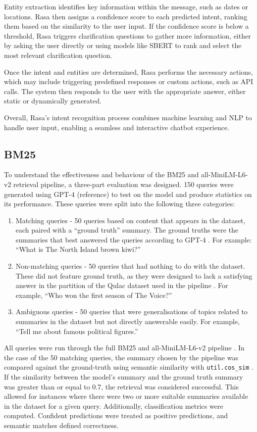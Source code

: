 \documentclass[11pt]{article}
\begin{document}
Entity extraction identifies key information within the message, such as dates or locations. Rasa then assigns a confidence score to each predicted intent, ranking them based on the similarity to the user input. If the confidence score is below a threshold, Rasa triggers clarification questions to gather more information, either by asking the user directly or using models like SBERT to rank and select the most relevant clarification question.

Once the intent and entities are determined, Rasa performs the necessary actions, which may include triggering predefined responses or custom actions, such as API calls. The system then responds to the user with the appropriate answer, either static or dynamically generated.

Overall, Rasa's intent recognition process combines machine learning and NLP to handle user input, enabling a seamless and interactive chatbot experience.

\subsection{BM25}
To understand the effectiveness and behaviour of the BM25 and all-MiniLM-L6-v2 retrieval pipeline, a three-part evaluation was designed. 150 queries were generated using GPT-4 (reference) to test on the model and produce statistics on its performance. These queries were split into the following three categories:
\begin{enumerate}
\item Matching queries - 50 queries based on content that appears in the dataset, each paired with a “ground truth” summary. The ground truths were the summaries that best answered the queries according to GPT-4 \cite{OpenAI2025}. For example: “What is The North Island brown kiwi?”
\item Non-matching queries - 50 queries that had nothing to do with the dataset. These did not feature ground truth, as they were designed to lack a satisfying answer in the partition of the Qulac dataset used in the pipeline \cite{Aliannejadi2021}. For example, “Who won the first season of The Voice?”
\item Ambiguous queries - 50 queries that were generalisations of topics related to summaries in the dataset but not directly answerable easily. For example, “Tell me about famous political figures.”
\end{enumerate}

All queries were run through the full BM25 and all-MiniLM-L6-v2 pipeline \cite{Brown2022,Tomaarsen2025a}. In the case of the 50 matching queries, the summary chosen by the pipeline was compared against the ground-truth using semantic similarity with \texttt{util.cos\_sim} \cite{Tomaarsen2025b}. If the similarity between the model's summary and the ground truth summary was greater than or equal to 0.7, the retrieval was considered successful. This allowed for instances where there were two or more suitable summaries available in the dataset for a given query. Additionally, classification metrics were computed. Confident predictions were treated as positive predictions, and semantic matches defined correctness.
\end{document}
